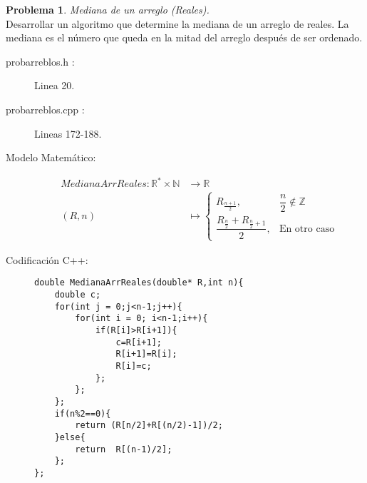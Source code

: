 \documentclass{article}
\theoremstyle{plain}
\theoremstyle{definition}
\newtheorem{problem}{Problema}
\begin{document}
\begin{problem} \emph{Mediana de un arreglo (Reales).}\\
\hspace*{7mm}Desarrollar un algoritmo que determine la mediana de un arreglo de reales.  La mediana es el número que queda en la mitad del arreglo después de ser ordenado.
\begin{description}
\item[probarreblos.h :] Linea 20. \item[probarreblos.cpp :] Lineas 172-188.

\item[Modelo Matemático:]
\begin{align*}
MedianaArrReales: \mathbb{R}^{*}\times\mathbb{N} &\to \mathbb{R}\\
(R,n) &\mapsto
\begin{cases}
R_{\frac{n+1}{2}},& \dfrac{n}{2}\not\in \mathbb{Z}\\
\dfrac{R_{\frac{n}{2}}+R_{\frac{n}{2}+1}}{2},& \text{En otro caso}
\end{cases}
\end{align*}
%
\item[Codificación \textsf{C++}:]\hfill
%
\begin{verbatim}
double MedianaArrReales(double* R,int n){
    double c;
    for(int j = 0;j<n-1;j++){
        for(int i = 0; i<n-1;i++){
            if(R[i]>R[i+1]){
                c=R[i+1];
                R[i+1]=R[i];
                R[i]=c;
            };
        };
    };
    if(n%2==0){
        return (R[n/2]+R[(n/2)-1])/2;
    }else{
        return  R[(n-1)/2];
    };
};
\end{verbatim}
\end{description}
\end{problem}
\end{document}
